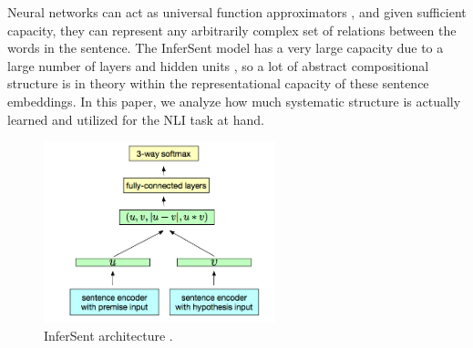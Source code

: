 Neural networks can act as universal function approximators \citep{siegelmann1995computational, hornik1991approximation}, and given sufficient capacity, they can represent any arbitrarily complex set of relations between the words in the sentence. The InferSent model has a very large capacity due to a large number of layers and hidden units \citep[see][]{Conneau:2017uf}, so a lot of abstract compositional structure is in theory within the representational capacity of these sentence embeddings. In this paper, we analyze how much systematic structure is actually learned and utilized for the NLI task at hand.


\begin{figure}
\centering
\includegraphics[width=0.6\textwidth]{figures/InferSent_arch.png}
\caption{InferSent architecture \citep{Conneau:2017uf}.}
\label{fig:arch}
\end{figure}



